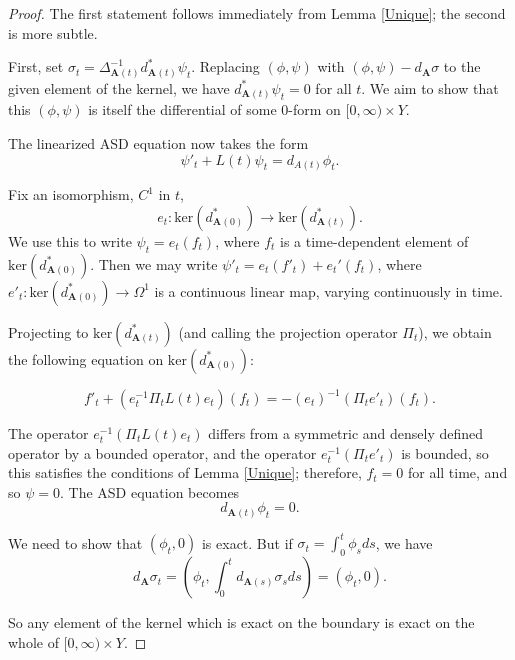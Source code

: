 \documentclass[10pt,a4paper]{amsart}
\theoremstyle{definition}
\theoremstyle{remark}
\numberwithin{figure}{qchap}
\begin{document}
\begin{proof}
The first statement follows immediately from Lemma \ref{Unique}; the second is more subtle. 

First, set $\sigma_t = \Delta_{\mathbf{A}(t)}^{-1}d_{\mathbf{A}(t)}^*\psi_t$. Replacing $(\phi, \psi)$ with $(\phi, \psi) - d_{\mathbf{A}} \sigma$ to the given element of the kernel, we have $d_{\mathbf{A}(t)}^* \psi_t = 0$ for all $t$. We aim to show that this $(\phi, \psi)$ is itself the differential of some 0-form on $[0,\infty) \times Y$. 

The linearized ASD equation now takes the form 
$$\psi'_t + L(t)\psi_t = d_{A(t)}\phi_t.$$ 

Fix an isomorphism, $C^1$ in $t$, $$e_t: \text{ker}(d_{\mathbf{A}(0)}^*) \to \text{ker}(d_{\mathbf{A}(t)}^*).$$ We use this to write $\psi_t = e_t(f_t)$, where $f_t$ is a time-dependent element of $\text{ker}(d_{\mathbf{A}(0)}^*)$. Then we may write $\psi'_t = e_t(f'_t) + e_t'(f_t)$, where $e'_t: \text{ker}(d_{\mathbf{A}(0)}^*) \to \Omega^1$ is a continuous linear map, varying continuously in time. 

Projecting to $\text{ker}(d_{\mathbf{A}(t)}^*)$ (and calling the projection operator $\Pi_t$), we obtain the following equation on $\text{ker}(d_{\mathbf{A}(0)}^*)$:

$$f'_t + (e_t^{-1}\Pi_t L(t) e_t)(f_t) = -(e_t)^{-1}(\Pi_t e'_t)(f_t).$$

The operator $e_t^{-1} (\Pi_t L(t) e_t)$ differs from a symmetric and densely defined operator by a bounded operator, and the operator $e_t^{-1}(\Pi_t e'_t)$ is bounded, so this satisfies the conditions of Lemma \ref{Unique}; therefore, $f_t = 0$ for all time, and so $\psi = 0$. The ASD equation becomes 
$$d_{\mathbf{A}(t)} \phi_t = 0.$$ 

We need to show that $(\phi_t, 0)$ is exact. But if $\sigma_t = \int_0^t \phi_s ds$, we have 
$$d_{\mathbf{A}} \sigma_t = (\phi_t, \int_0^t d_{\mathbf{A}(s)} \sigma_s ds) = (\phi_t, 0).$$ 

So any element of the kernel which is exact on the boundary is exact on the whole of $[0,\infty) \times Y$. 
\end{proof}
\end{document}
